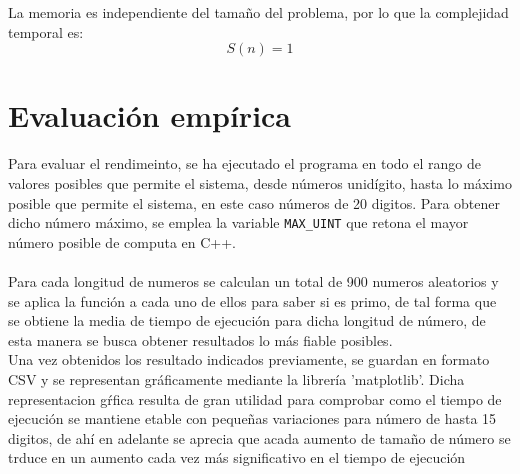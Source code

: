 La memoria es independiente del tamaño del problema, por lo que la complejidad temporal es:
\begin{equation}
    S(n) = 1
\end{equation}



\section{Evaluación empírica}

Para evaluar el rendimeinto, se ha ejecutado el programa en todo el rango de valores posibles que permite el sistema, desde números unidígito, hasta lo máximo posible que permite el sistema, en este caso números de 20 digitos. Para obtener dicho número máximo, se emplea la variable \texttt{MAX\_UINT} que retona el mayor número posible de computa en C++.\\
\\
Para cada longitud de numeros se calculan un total de 900 numeros aleatorios y se aplica la función a cada uno de ellos para saber si es primo, de tal forma que se obtiene la media de tiempo de ejecución para dicha longitud de número, de esta manera se busca obtener resultados lo más fiable posibles.\\


Una vez obtenidos los resultado indicados previamente, se guardan en formato CSV y se representan gráficamente mediante la librería 'matplotlib'. Dicha representacion gŕfica resulta de gran utilidad para comprobar como el tiempo de ejecución se mantiene etable con pequeñas variaciones para número de hasta 15 digitos, de ahí en adelante se aprecia que acada aumento de tamaño de número se trduce en un aumento cada vez más significativo en el tiempo de ejecución 

\begin{figure}[H]
\end{figure}

\newpage